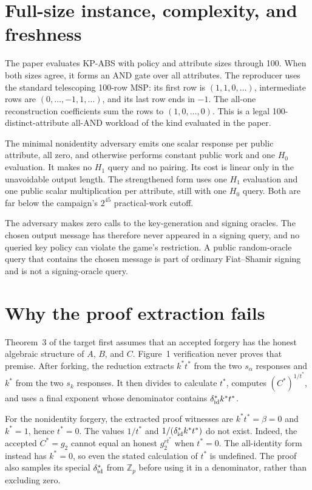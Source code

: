 \documentclass[10pt,a4paper]{article}
\newcommand{\Zp}{\mathbb{Z}_p}
\begin{document}
\section{Full-size instance, complexity, and freshness}

The paper evaluates KP-ABS with policy and attribute sizes through 100. When
both sizes agree, it forms an AND gate over all attributes. The reproducer
uses the standard telescoping 100-row MSP: its first row is
$(1,1,0,\ldots)$, intermediate rows are
$(0,\ldots,-1,1,\ldots)$, and its last row ends in $-1$. The all-one
reconstruction coefficients sum the rows to $(1,0,\ldots,0)$. This is a legal
100-distinct-attribute all-AND workload of the kind evaluated in the paper.

The minimal nonidentity adversary emits one scalar response per public
attribute, all zero, and otherwise performs constant public work and one
$H_0$ evaluation. It makes no $H_1$ query and no pairing. Its cost is linear
only in the unavoidable output length. The strengthened form uses one $H_1$
evaluation and one public scalar multiplication per attribute, still with one
$H_0$ query. Both are far below the campaign's $2^{45}$ practical-work cutoff.

The adversary makes zero calls to the key-generation and signing oracles. The
chosen output message has therefore never appeared in a signing query, and no
queried key policy can violate the game's restriction. A public random-oracle
query that contains the chosen message is part of ordinary Fiat--Shamir
signing and is not a signing-oracle query.

\section{Why the proof extraction fails}

Theorem~3 of the target first assumes that an accepted forgery has the honest
algebraic structure of $A$, $B$, and $C$. Figure~1 verification never proves
that premise. After forking, the reduction extracts $k^*t^*$ from the two
$s_\alpha$ responses and $k^*$ from the two $s_k$ responses. It then divides
to calculate $t^*$, computes $(C^*)^{1/t^*}$, and uses a final exponent whose
denominator contains $\delta^*_{\rm id}k^*t^*$.

For the nonidentity forgery, the extracted proof witnesses are
$k^*t^*=\beta=0$ and $k^*=1$, hence $t^*=0$. The values $1/t^*$ and
$1/(\delta^*_{\rm id}k^*t^*)$ do not exist. Indeed, the accepted
$C^*=g_2$ cannot equal an honest $g_2^{r t^*}$ when $t^*=0$. The all-identity
form instead has $k^*=0$, so even the stated calculation of $t^*$ is
undefined. The proof also samples its special $\delta^*_{\rm id}$ from
$\Zp$ before using it in a denominator, rather than excluding zero.
\end{document}
